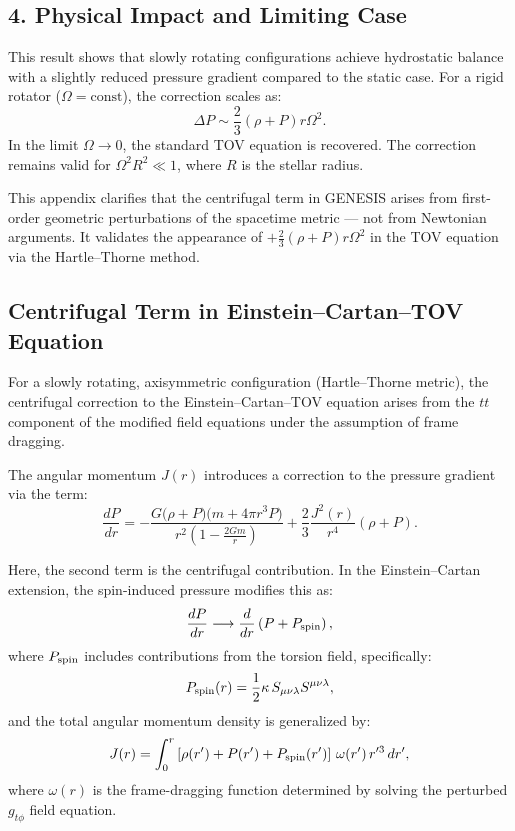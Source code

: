 \documentclass{article}
\begin{document}
\subsection*{4. Physical Impact and Limiting Case}
This result shows that slowly rotating configurations achieve hydrostatic balance with a slightly reduced pressure gradient compared to the static case. For a rigid rotator (\( \Omega = \text{const} \)), the correction scales as:
\[
\Delta P \sim \frac{2}{3}(\rho + P) r \Omega^2.
\]
In the limit \( \Omega \rightarrow 0 \), the standard TOV equation is recovered. The correction remains valid for \( \Omega^2 R^2 \ll 1 \), where \( R \) is the stellar radius.

\begin{tcolorbox}[colback=gray!5, colframe=black!30, title=Why this matters]
This appendix clarifies that the centrifugal term in GENESIS arises from first-order geometric perturbations of the spacetime metric — not from Newtonian arguments. It validates the appearance of \( +\frac{2}{3}(\rho + P) r \Omega^2 \) in the TOV equation via the Hartle–Thorne method.
\end{tcolorbox}

\subsection*{ Centrifugal Term in Einstein–Cartan–TOV Equation}

For a slowly rotating, axisymmetric configuration (Hartle–Thorne metric), the centrifugal correction to the Einstein–Cartan–TOV equation arises from the $tt$ component of the modified field equations under the assumption of frame dragging.

The angular momentum $J(r)$ introduces a correction to the pressure gradient via the term:
\[
\frac{dP}{dr} = -\frac{G \big( \rho + P \big)\big( m + 4\pi r^3 P \big)}{r^2 \left( 1 - \frac{2Gm}{r} \right)} + \frac{2}{3} \frac{J^2(r)}{r^4} \left( \rho + P \right).
\]

Here, the second term is the centrifugal contribution. In the Einstein–Cartan extension, the spin-induced pressure modifies this as:
\[
\frac{dP}{dr} \longrightarrow \frac{d}{dr} \left( P + P_{\rm spin} \right),
\]
where $P_{\rm spin}$ includes contributions from the torsion field, specifically:
\[
P_{\rm spin}(r) = \frac{1}{2} \kappa \, S_{\mu\nu\lambda} S^{\mu\nu\lambda},
\]
and the total angular momentum density is generalized by:
\[
J(r) = \int_0^r \left[ \rho(r') + P(r') + P_{\rm spin}(r') \right] \, \omega(r') \, r'^3 \, dr',
\]
where $\omega(r)$ is the frame-dragging function determined by solving the perturbed $g_{t\phi}$ field equation.
\end{document}
